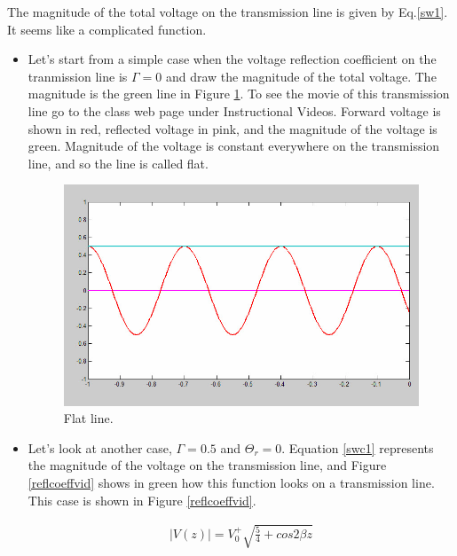 \documentclass{ximera}
\begin{document}
The magnitude of the total voltage on the transmission line is given
by Eq.\ref{sw1}. It seems like a complicated function.

\begin{itemize}
 \item Let's start 
from a simple case when the voltage reflection coefficient on the
tranmission line is $\Gamma=0$ and draw the magnitude of the total
voltage. The magnitude is the green line in Figure \ref{flatline}. To see the movie
of this transmission line go to the class web page under Instructional Videos. Forward voltage is shown in red, reflected voltage in pink,
and the magnitude of the voltage is  green. Magnitude of the voltage is constant everywhere on the transmission line, and so the line
is called flat.




\begin{figure}[htbp]
\begin{center}
\includegraphics[scale=0.3]{../jpg/flatline.jpg}
\end{center}
\caption{Flat line.}
\label{flatline}
\end{figure}



\item Let's look at another case,  $\Gamma=0.5$ and $\Theta_r=0$. Equation \ref{swc1}  represents the magnitude of the voltage on the transmission line, and Figure \ref{reflcoeffvid} shows in green how this function looks on a transmission line. This case is shown in Figure \ref{reflcoeffvid}. 

\begin{eqnarray}
|V(z)|=V_0^+ \sqrt{\frac{5}{4}+ cos{2 \beta z} }\label{swc1}
\end{eqnarray}


\end{itemize}
\end{document}
